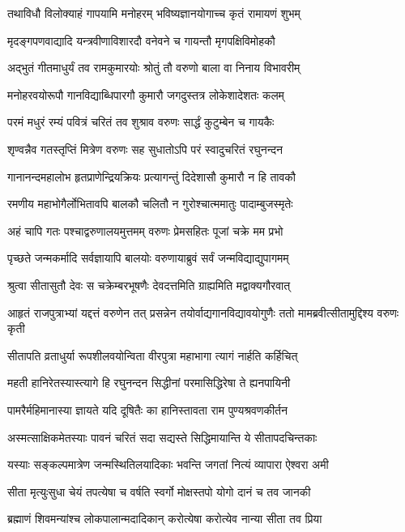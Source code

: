 \twolineshloka
{तथाविधौ विलोक्याहं गापयामि मनोहरम्}
{भविष्यज्ञानयोगाच्च कृतं रामायणं शुभम्}%

\twolineshloka
{मृदङ्गपणवाद्यादि यन्त्रवीणाविशारदौ}
{वनेवने च गायन्तौ मृगपक्षिविमोहकौ}%

\twolineshloka
{अद्भुतं गीतमाधुर्यं तव रामकुमारयोः}
{श्रोतुं तौ वरुणो बाला वा निनाय विभावरीम्}%

\twolineshloka
{मनोहरवयोरूपौ गानविद्याब्धिपारगौ}
{कुमारौ जगदुस्तत्र लोकेशादेशतः कलम्}%

\twolineshloka
{परमं मधुरं रम्यं पवित्रं चरितं तव}
{शुश्राव वरुणः सार्द्धं कुटुम्बेन च गायकैः}%

\twolineshloka
{शृण्वन्नैव गतस्तृप्तिं मित्रेण वरुणः सह}
{सुधातोऽपि परं स्वादुचरितं रघुनन्दन}%

\twolineshloka
{गानानन्दमहालोभ हृतप्राणेन्द्रियक्रियः}
{प्रत्यागन्तुं दिदेशासौ कुमारौ न हि तावकौ}%

\twolineshloka
{रमणीय महाभोगैर्लोभितावपि बालकौ}
{चलितौ न गुरोश्चात्ममातुः पादाम्बुजस्मृतेः}%

\twolineshloka
{अहं चापि गतः पश्चाद्वरुणालयमुत्तमम्}
{वरुणः प्रेमसहितः पूजां चक्रे मम प्रभो}%

\twolineshloka
{पृच्छते जन्मकर्मादि सर्वज्ञायापि बालयोः}
{वरुणायाब्रुवं सर्वं जन्मविद्याद्युपागमम्}%

\twolineshloka
{श्रुत्वा सीतासुतौ देवः स चक्रेम्बरभूषणैः}
{देवदत्तमिति ग्राह्यमिति मद्वाक्यगौरवात्}%


\threelineshloka
{आहृतं राजपुत्राभ्यां यद्दत्तं वरुणेन तत्}
{प्रसन्नेन तयोर्वाद्यगानविद्यावयोगुणैः}
{ततो मामब्रवीत्सीतामुद्दिश्य वरुणः कृती}%

\twolineshloka
{सीतापति व्रताधुर्या रूपशीलवयोन्विता}
{वीरपुत्रा महाभागा त्यागं नार्हति कर्हिचित्}%

\twolineshloka
{महती हानिरेतस्यास्त्यागे हि रघुनन्दन}
{सिद्धीनां परमासिद्धिरेषा ते ह्यनपायिनी}%

\twolineshloka
{पामरैर्महिमानास्या ज्ञायते यदि दूषितैः}
{का हानिस्तावता राम पुण्यश्रवणकीर्तन}%

\twolineshloka
{अस्मत्साक्षिकमेतस्याः पावनं चरितं सदा}
{सद्यस्ते सिद्धिमायान्ति ये सीतापदचिन्तकाः}%

\twolineshloka
{यस्याः सङ्कल्पमात्रेण जन्मस्थितिलयादिकाः}
{भवन्ति जगतां नित्यं व्यापारा ऐश्वरा अमी}%

\twolineshloka
{सीता मृत्युःसुधा चेयं तपत्येषा च वर्षति}
{स्वर्गो मोक्षस्तपो योगो दानं च तव जानकी}%

\twolineshloka
{ब्रह्माणं शिवमन्यांश्च लोकपालान्मदादिकान्}
{करोत्येषा करोत्येव नान्या सीता तव प्रिया}%

